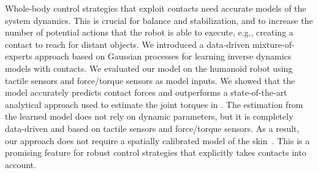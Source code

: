 

Whole-body control strategies that exploit contacts need accurate models of the system dynamics.
This is crucial for balance and stabilization, and to increase the number of potential actions that the robot is able to execute, e.g., creating a contact to reach for distant objects.
%
We introduced a data-driven mixture-of-experts approach based on Gaussian processes  for learning inverse dynamics models with contacts. 
We evaluated our model on the \robot{} humanoid robot using tactile sensors and force/torque sensors as model inputs.  
We showed that the model accurately predicts contact forces and outperforms a state-of-the-art analytical approach used to estimate the joint torques in \robot{}. 
The estimation from the learned model does not rely on dynamic parameters, but it is completely data-driven and based on tactile sensors and force/torque sensors. %
As a result, our approach does not require a spatially calibrated model of the skin~\cite{DelPrete2011,DelPrete2012}.
This is a promising feature for robust control strategies that explicitly takes contacts into account. 



